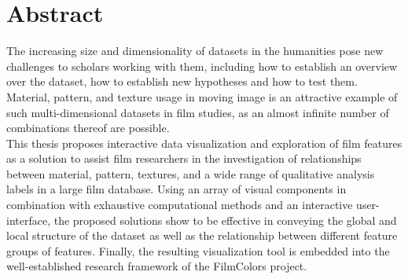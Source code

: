 
\chapter{Abstract} \label{chp:abstract}

The increasing size and dimensionality of datasets in the humanities pose new challenges to scholars working with them, including how to establish an overview over the dataset, how to establish new hypotheses and how to test them. Material, pattern, and texture usage in moving image is an attractive example of such multi-dimensional datasets in film studies, as an almost infinite number of combinations thereof are possible.\\ 
This thesis proposes interactive data visualization and exploration of film features as a solution to assist film researchers in the investigation of relationships between material, pattern, textures, and a wide range of qualitative analysis labels in a large film database. Using an array of visual components in combination with exhaustive computational methods and an interactive user-interface, the proposed solutions show to be effective in conveying the global and local structure of the dataset as well as the relationship between different feature groups of features. Finally, the resulting visualization tool is embedded into the well-established research framework of the FilmColors project.

